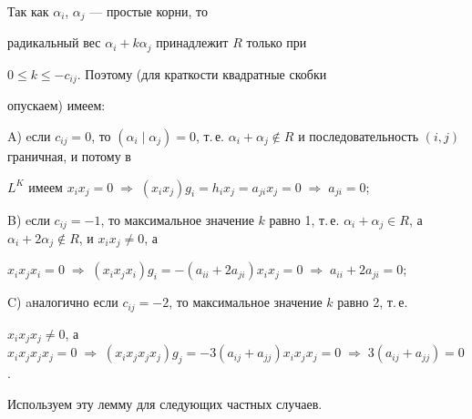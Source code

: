 \begin{pf}


Так как $\alpha_i$, $\alpha_j$ --- простые корни, то


радикальный вес $\alpha_i+k\alpha_j$ принадлежит $R$ только при


$0\le k\le -c_{ij}$. Поэтому (для краткости квадратные скобки


опускаем) имеем:





A) eсли $c_{ij}=0$, то $(\alpha_i\mid \alpha_j)=0$, т.\,е. $\alpha_i+


\alpha_j\notin R$ и последовательность $(i,j)$ граничная, и потому в


$L^K$ имеем $x_ix_j=0 \;\Rightarrow \;(x_ix_j)g_i=h_ix_j=a_{ji}x_j=0\;


\Rightarrow \;a_{ji}=0$;





B) eсли $c_{ij}=-1$, то максимальное значение $k$ равно 1, т.\,е. $\alpha_i


+\alpha_j\in R$, а $\alpha_i+2\alpha_j\notin R$, и $x_ix_j\ne0$, а


$x_ix_jx_i=0\;\Rightarrow\; (x_ix_jx_i)g_i=-(a_{ii}+2a_{ji})x_ix_j=0\;


\Rightarrow\;a_{ii}+2a_{ji}=0$;





C) aналогично если $c_{ij}=-2$, то максимальное значение $k$ равно 2, т.\,е.


$x_ix_jx_j\ne0$, а $x_ix_jx_jx_j=0 \;\Rightarrow\; (x_ix_jx_jx_j)g_j=


-3(a_{ij}+a_{jj})x_ix_jx_j=0\;\Rightarrow \; 3(a_{ij}+a_{jj})=0$.


\end{pf}





Используем эту лемму для следующих частных случаев.





